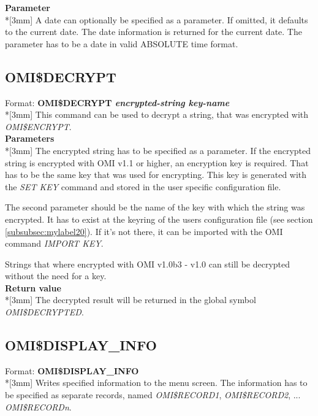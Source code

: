 \documentclass[a4paper]{book}
\newcommand{\vs}{\vspace{3mm}}
\renewcommand{\indent}{\hspace*{5mm}}
\begin{document}
\vs

\noindent\textbf{Parameter}\\*[3mm]
A date can optionally be specified as a parameter. If omitted, it defaults 
to the current date. The date information is returned for the current date. 
The parameter has to be a date in valid ABSOLUTE time format.

\subsection{OMI{\$}DECRYPT}
\label{subsubsec:mylabel50}

\indent Format: \textbf{OMI{\$}DECRYPT \textit{encrypted-string key-name}}\\*[3mm]
This command can be used to decrypt a string, that was encrypted with 
\linebreak\textsl{OMI{\$}ENCRYPT}.\\[3mm]
\textbf{Parameters}\\*[3mm]
The encrypted string has to be specified as a parameter. If the encrypted 
string is encrypted with OMI v1.1 or higher, an encryption key is required. 
That has to be the same key that was used for encrypting. This key is 
generated with the \textsl{SET KEY} command and stored in the user specific 
configuration file.

\vs

The second parameter should be the name of the key with which the string was 
encrypted. It has to exist at the keyring of the users configuration file 
(see section \ref{subsubsec:mylabel20}). If it's not there, it can be 
imported with the OMI command \textsl{IMPORT KEY}.

Strings that where encrypted with OMI v1.0b3 - v1.0 can still be decrypted 
without the need for a key.\\[3mm]
\textbf{Return value}\\*[3mm]
The decrypted result will be returned in the global symbol \textsl{OMI{\$}DECRYPTED}.

\subsection{OMI{\$}DISPLAY{\_}INFO}
\label{subsubsec:mylabel51}

\indent Format: \textbf{OMI{\$}DISPLAY{\_}INFO}\\*[3mm]
Writes specified information to the menu screen. The information has to be 
specified as separate records, named \textsl{OMI{\$}RECORD1}, \textsl{OMI{\$}RECORD2}, ... 
\textsl{OMI{\$}RECORD\textit{n}}.
\end{document}
